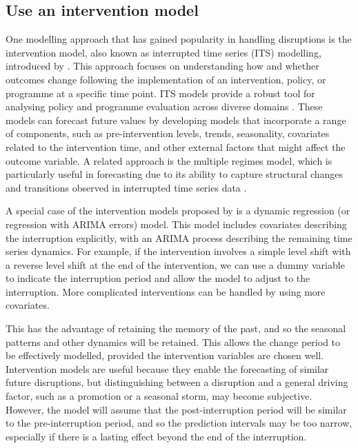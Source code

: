 \documentclass[
  11pt,
  a4paper,
]{article}
\begin{document}
\subsection{Use an intervention model}\label{use-an-intervention-model}

One modelling approach that has gained popularity in handling
disruptions is the intervention model, also known as interrupted time
series (ITS) modelling, introduced by \textcite{box1975intervention}.
This approach focuses on understanding how and whether outcomes change
following the implementation of an intervention, policy, or programme at
a specific time point. ITS models provide a robust tool for analysing
policy and programme evaluation across diverse domains
\autocite{bernal2017interrupted,mcdowall2019interrupted}. These models
can forecast future values by developing models that incorporate a range
of components, such as pre-intervention levels, trends, seasonality,
covariates related to the intervention time, and other external factors
that might affect the outcome variable. A related approach is the
multiple regimes model, which is particularly useful in forecasting due
to its ability to capture structural changes and transitions observed in
interrupted time series data \autocite{Koopg2007}.

A special case of the intervention models proposed by
\textcite{box1975intervention} is a dynamic regression (or regression
with ARIMA errors) model. This model includes covariates describing the
interruption explicitly, with an ARIMA process describing the remaining
time series dynamics. For example, if the intervention involves a simple
level shift with a reverse level shift at the end of the intervention,
we can use a dummy variable to indicate the interruption period and
allow the model to adjust to the interruption. More complicated
interventions can be handled by using more covariates.

This has the advantage of retaining the memory of the past, and so the
seasonal patterns and other dynamics will be retained. This allows the
change period to be effectively modelled, provided the intervention
variables are chosen well. Intervention models are useful because they
enable the forecasting of similar future disruptions, but distinguishing
between a disruption and a general driving factor, such as a promotion
or a seasonal storm, may become subjective. However, the model will
assume that the post-interruption period will be similar to the
pre-interruption period, and so the prediction intervals may be too
narrow, especially if there is a lasting effect beyond the end of the
interruption.
\end{document}
